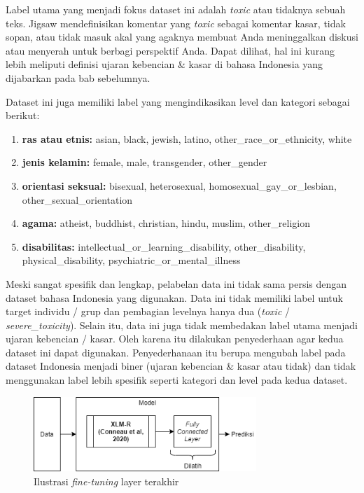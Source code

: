 	Label utama yang menjadi fokus dataset ini adalah \textit{toxic} atau tidaknya sebuah teks. Jigsaw mendefinisikan komentar yang \textit{toxic} sebagai komentar kasar, tidak sopan, atau tidak masuk akal yang agaknya membuat Anda meninggalkan diskusi atau menyerah untuk berbagi perspektif Anda. Dapat dilihat, hal ini kurang lebih meliputi definisi ujaran kebencian \& kasar di bahasa Indonesia yang dijabarkan pada bab sebelumnya.

	Dataset ini juga memiliki label yang mengindikasikan level dan kategori sebagai berikut:
	\begin{enumerate}
		\item \textbf{ras atau etnis:} asian, black, jewish, latino, other\_race\_or\_ethnicity, white
		\item  \textbf{jenis kelamin:} female, male, transgender, other\_gender
		\item  \textbf{orientasi seksual:} bisexual, heterosexual, homosexual\_gay\_or\_lesbian, \\
		other\_sexual\_orientation
		\item \textbf{agama:} atheist, buddhist, christian, hindu, muslim, other\_religion
		\item \textbf{disabilitas:} intellectual\_or\_learning\_disability, other\_disability, physical\_disability, psychiatric\_or\_mental\_illness
	\end{enumerate}

	Meski sangat spesifik dan lengkap, pelabelan data ini tidak sama persis dengan dataset bahasa Indonesia yang digunakan. Data ini tidak memiliki label untuk target individu / grup dan pembagian levelnya hanya dua (\textit{toxic} / \textit{severe\_toxicity}). Selain itu, data ini juga tidak membedakan label utama menjadi ujaran kebencian / kasar. Oleh karena itu dilakukan penyederhaan agar kedua dataset ini dapat digunakan. Penyederhanaan itu berupa mengubah label pada dataset Indonesia menjadi biner (ujaran kebencian \& kasar atau tidak) dan tidak menggunakan label lebih spesifik seperti kategori dan level pada kedua dataset.

	\begin{figure}[t]
		\centering
		\includegraphics[width=0.75\textwidth]{resources/Head-fine-tune.png}
		\caption{ Ilustrasi \textit{fine-tuning} layer terakhir}
		\label{fig:ilustrasi_head_fine_tune}
	\end{figure}

